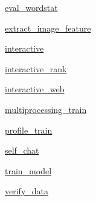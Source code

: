 \begin{DoxyCompactItemize}
 \hyperlink{namespaceparlai_1_1scripts_1_1eval__wordstat}{eval\+\_\+wordstat}
\item 
 \hyperlink{namespaceparlai_1_1scripts_1_1extract__image__feature}{extract\+\_\+image\+\_\+feature}
\item 
 \hyperlink{namespaceparlai_1_1scripts_1_1interactive}{interactive}
\item 
 \hyperlink{namespaceparlai_1_1scripts_1_1interactive__rank}{interactive\+\_\+rank}
\item 
 \hyperlink{namespaceparlai_1_1scripts_1_1interactive__web}{interactive\+\_\+web}
\item 
 \hyperlink{namespaceparlai_1_1scripts_1_1multiprocessing__train}{multiprocessing\+\_\+train}
\item 
 \hyperlink{namespaceparlai_1_1scripts_1_1profile__train}{profile\+\_\+train}
\item 
 \hyperlink{namespaceparlai_1_1scripts_1_1self__chat}{self\+\_\+chat}
\item 
 \hyperlink{namespaceparlai_1_1scripts_1_1train__model}{train\+\_\+model}
\item 
 \hyperlink{namespaceparlai_1_1scripts_1_1verify__data}{verify\+\_\+data}
\end{DoxyCompactItemize}
